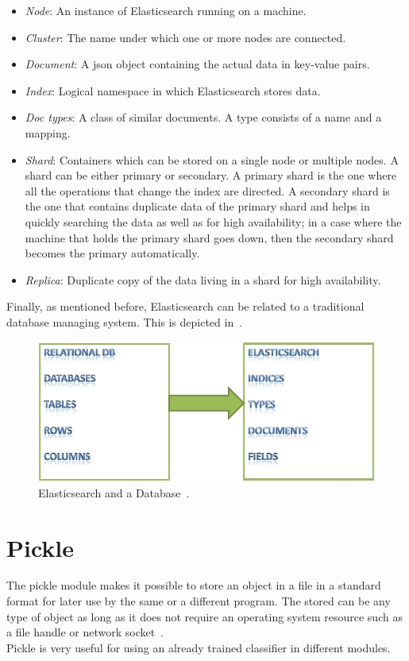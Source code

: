 \begin{itemize}
	\item \textit{Node}: An instance of Elasticsearch running on a machine.
	\item \textit{Cluster}: The name under which one or more nodes are connected.
	\item \textit{Document}: A \ac{json} object containing the actual data in key-value pairs.
	\item \textit{Index}: Logical namespace in which Elasticsearch stores data.
	\item \textit{Doc types}: A class of similar documents. A type consists of a name and a mapping.
	\item \textit{Shard}: Containers which can be stored on a single node or multiple nodes. A  shard can be either primary or secondary. A primary shard is the one where all the operations that change the index are directed. A secondary shard is the one that contains duplicate data of the primary shard and helps in quickly searching the data as well as for high availability; in a case where the machine that holds the primary shard goes down, then the secondary shard becomes the primary automatically.
	\item \textit{Replica}: Duplicate copy of the data living in a shard for high availability.
\end{itemize}
Finally, as mentioned before, Elasticsearch can be related to a traditional database managing system. This is depicted in~.
\begin{figure}
	\includegraphics[scale=0.65]{img/elastic_1.png}
	\caption{Elasticsearch and a Database~\cite{elastic1}.}
	\label{fig:elastic2}
\end{figure}
\section{Pickle}
The pickle module makes it possible to store an object in a file in a standard format for later use by the same or a different program. The stored can be any type of object as long as it does not require an operating system resource such as a file handle or network socket~\cite{pickle}.\\
Pickle is very useful for using an already trained classifier in different modules.




